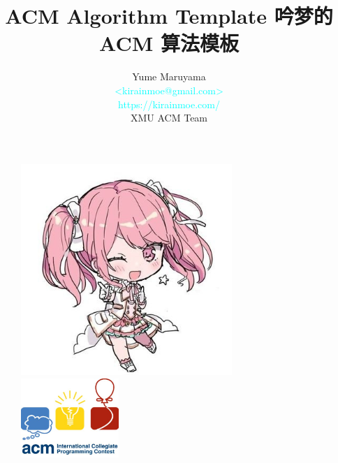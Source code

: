 \documentclass[12pt]{report}
\title{\Huge \textbf{ACM Algorithm Template} \linebreak \linebreak \large \textcolor{primary-blue}{\textbf{吟梦的 ACM 算法模板}}}
\author{Yume Maruyama \\ \small \textcolor{cyan}{<kirainmoe@gmail.com>} \\ \small \textcolor{cyan}{https://kirainmoe.com/} \\ \small XMU ACM Team}
\begin{document}
\begin{titlepage}
    \begin{figure}
        \centering
        \includegraphics[height=8cm]{images/avatar.jpg}
        \par\includegraphics[height=3cm]{images/acm.jpg}
    \end{figure}
    
    \maketitle
\end{titlepage}

\clearpage
\phantom{s}
\setcounter{page}{0}
\thispagestyle{empty}
\clearpage

\tableofcontents


























 
\end{document}
